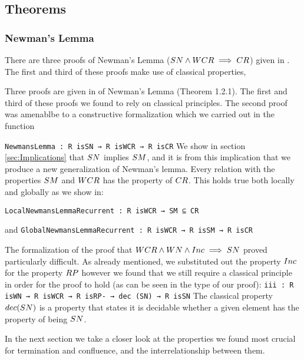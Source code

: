 \subsection{Theorems}
\subsubsection{Newman's Lemma}
There are three proofs of Newman's Lemma ($\SN \land \WCR \implies \CR$) given in \terese. 
The first and third of these proofs make use of classical properties, 



Three proofs are given in \terese of Newman's Lemma (Theorem 1.2.1). The first and third of 
these proofs we found to rely on classical principles. The second proof was amenablbe to a 
constructive formalization which we carried out in the function 


\verb|NewmansLemma : R isSN → R isWCR → R isCR| \footnotemark[2]
We show in section \ref{sec:Implications} that $\SN$ implies $\SM$, and it is from this implication 
that we produce a new generalization of Newman's lemma. Every relation with the properties 
$\SM$ and $\WCR$ has the property of $\CR$. This holds true both locally and globally as we show in:

\verb|LocalNewmansLemmaRecurrent : R isWCR → SM ⊆ CR| \footnotemark[2]

and \verb|GlobalNewmansLemmaRecurrent : R isWCR → R isSM → R isCR| \footnotemark[2]

The formalization of the proof that $\WCR \land \WN \land \Inc \implies \SN$ proved particularly difficult. 
As already mentioned, we substituted out the property $\Inc$ for the property $\RP$ however 
we found that we still require a classical principle in order for the proof to hold (as can be seen in the type of our proof):
\verb|iii : R isWN → R isWCR → R isRP- → dec (SN) → R isSN| \footnotemark[3] 
The classical property $\decSN$ is a property that states it is decidable whether a given 
element has the property of being $\SN$. 

In the next section we take a closer look at the properties we found most crucial for termination and confluence, and the interrelationship between them.

